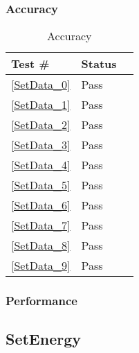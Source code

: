 \documentclass[12pt]{article}
\begin{document}
	\subsubsection{Accuracy}
		\begin{table}[H]
		\centering
		\caption{Accuracy}\label{GetY_acc}
		\begin{tabular}{lll}
		\toprule
		\bf Test \# & Status \\\midrule
		\ref{SetData_0} & Pass\\
		\ref{SetData_1} & Pass\\
		\ref{SetData_2} & Pass\\
		\ref{SetData_3} & Pass\\
		\ref{SetData_4} & Pass\\
		\ref{SetData_5} & Pass\\
		\ref{SetData_6} & Pass\\
		\ref{SetData_7} & Pass\\
		\ref{SetData_8} & Pass\\
		\ref{SetData_9} & Pass\\
		\bottomrule
		\end{tabular}
		\end{table}
	\subsubsection{Performance}

\subsection{SetEnergy} %
\end{document}
